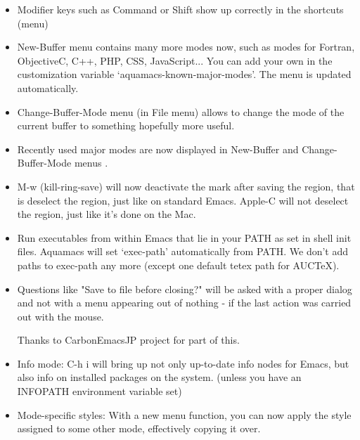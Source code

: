 \begin{itemize}
        {\tt (setq mac-function-modifier 'meta)}

        Note that support of the Fn key is experimental. Rare
        combinations may fail on non-English keyboard layouts,
        and some keys will not work correctly in combination with Fn and Shift.

\item Modifier keys such as Command or Shift show up correctly in the
        shortcuts (menu)

\item New-Buffer menu contains many more modes now, such as modes for
        Fortran, ObjectiveC, C++, PHP, CSS, JavaScript...
        You can add your own in the customization variable
        `aquamacs-known-major-modes'. The menu is updated automatically.

\item Change-Buffer-Mode menu (in File menu) allows to change the mode
        of the current buffer to something hopefully more useful.

\item Recently used major modes are now displayed in New-Buffer and
        Change-Buffer-Mode menus .

\item M-w (kill-ring-save) will now deactivate the mark after saving
        the region, that is deselect the region, just like on standard
        Emacs. Apple-C will not deselect the region, just like it's done
        on the Mac.

      \item Run executables from within Emacs that lie in your PATH as
        set in shell init files. Aquamacs will set `exec-path'
        automatically from PATH.  We don't add paths to exec-path any
        more (except one default tetex path for AUCTeX).

\item Questions like "Save to file before closing?" will be asked with
        a proper dialog and not with a menu appearing out of nothing - if
        the last action was carried out with the mouse.

        Thanks to CarbonEmacsJP project for part of this.

\item Info mode: C-h i  will bring up not only up-to-date info nodes
        for Emacs, but also info on installed packages on the system.
        (unless you have an INFOPATH environment variable set)

\item Mode-specific styles: With a new menu function, you can now
        apply the style assigned to some other mode, effectively copying
        it over.


\end{itemize}
